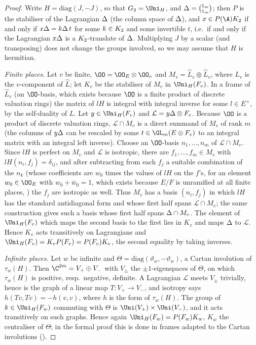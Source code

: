 \begin{proof}
Write $H=\mathrm{diag}(J,-J)$, so that $G_2=\Uni_H$, and $\Delta={1_m\choose1_m}$; then $P$ is the stabiliser of the Lagrangian
$\Delta$ (the column space of $\Delta$), and $x\in P(\A)\tliftK$ if and only if $x\Delta=k\Delta\,t$ for some $k\in K_2$ and some
invertible $t$, i.e.\ if and only if the Lagrangian $x\Delta$ is a $K_2$-translate of $\Delta$. Multiplying $J$ by a scalar (and
transposing) does not change the groups involved, so we may assume that $H$ is hermitian.

\emph{Finite places.} Let $v$ be finite, $\OO=\OO_E\otimes\OO_v$ and $M_v=\widehat L_v\oplus\widehat L_v$, where $\widehat L_v$ is the
$v$-component of $\widehat L$; let $K_v$ be the stabiliser of $M_v$ in $\Uni_H(F_v)$. In a frame of $\widehat L_v$ (an
$\OO$-basis, which exists because $\OO$ is a finite product of discrete valuation rings) the matrix of $lH$ is integral with
integral inverse for some $l\in E^\times$, by the self-duality of $L$. Let $y\in\Uni_H(F_v)$ and $\mathcal L=y\Delta\otimes F_v$.
Because $\OO$ is a product of discrete valuation rings, $\mathcal L\cap M_v$ is a direct summand of $M_v$ of rank $m$ (the columns
of $y\Delta$ can be rescaled by some $t\in\GL_m(E\otimes F_v)$ to an integral matrix with an integral left inverse). Choose
an $\OO$-basis $n_1,\dots,n_m$ of $\mathcal L\cap M_v$. Since $lH$ is perfect on $M_v$ and $\mathcal L$ is isotropic, there are
$f_1,\dots,f_m\in M_v$ with $lH(n_i,f_j)=\delta_{ij}$, and after subtracting from each $f_j$ a suitable combination of the
$n_k$ (whose coefficients are $w_0$ times the values of $lH$ on the $f$'s, for an element $w_0\in\OO_E$ with $w_0+\bar w_0=1$,
which exists because $E/F$ is unramified at all finite places,
) the $f_j$ are isotropic as well. Thus $M_v$ has a
basis $(n_i,f_j)$ in which $lH$ has the standard antidiagonal form and whose first half spans $\mathcal L\cap M_v$; the same
construction gives such a basis whose first half spans $\Delta\cap M_v$. The element of $\Uni_H(F_v)$ which maps the second
basis to the first lies in $K_v$ and maps $\Delta$ to $\mathcal L$. Hence $K_v$ acts transitively on Lagrangians and
$\Uni_H(F_v)=K_vP(F_v)=P(F_v)K_v$, the second equality by taking inverses.

\emph{Infinite places.} Let $w$ be infinite and $\Theta=\mathrm{diag}(\vartheta_w,-\vartheta_w)$, a Cartan involution of $\tau_w(H)$. Then
$\C^{2m}=V_+\oplus V_-$ with $V_\pm$ the $\pm1$-eigenspaces of $\Theta$, on which $\tau_w(H)$ is positive, resp.\ negative,
definite. A Lagrangian $\mathcal L$ meets $V_\pm$ trivially, hence is the graph of a linear map $T\colon V_+\to V_-$, and
isotropy says $h(Tv,Tv)=-h(v,v)$, where $h$ is the form of $\tau_w(H)$. The group of $k\in\Uni_H(F_w)$ commuting with $\Theta$ is
$\Uni(V_+)\times\Uni(V_-)$, and it acts transitively on such graphs. Hence again $\Uni_H(F_w)=P(F_w)K_w$, $K_w$ the
centraliser of $\Theta$; in the formal proof this is done in frames adapted to the Cartan involutions
().


\end{proof}
